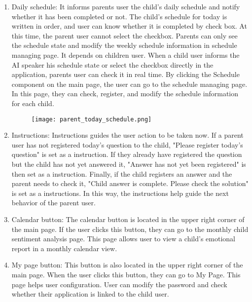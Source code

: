 \documentclass[conference]{IEEEtran}
\begin{document}
\begin{enumerate}
\begin{enumerate}
                \item Daily schedule:
                It informs parents user the child's daily schedule and notify whether it has been completed or not. The child's schedule for today is written in order, and user can know whether it is completed by check box. At this time, the parent user cannot select the checkbox. Parents can only see the schedule state and modify the weekly schedule information in schedule managing page. It depends on children user. When a child user informs the AI speaker his schedule state or select the checkbox directly in the application, parents user can check it in real time. \hfill \break
                By clicking the Schedule component on the main page, the user can go to the schedule managing page. In this page, they can check, register, and modify the schedule information for each child.
                \begin{figure}[H]
                 \centering
                 \texttt{[image: parent\_today\_schedule.png]}
                 \end{figure}
                \item Instructions:
                Instructions guides the user action to be taken now. If a parent user has not registered today's question to the child, "Please register today's question" is set as a instruction. If they already have registered the question but the child has not yet answered it, "Answer has not yet been registered" is then set as a instruction. Finally, if the child registers an answer and the parent needs to check it, "Child answer is complete. Please check the solution" is set as a instructions. In this way, the instructions help guide the next behavior of the parent user.
                \item Calendar button:
                The calendar button is located in the upper right corner of the main page. If the user clicks this button, they can go to the monthly child sentiment analysis page. This page allows user to view a child's emotional report in a monthly calendar view.
                \item My page button:
                This button is also located in the upper right corner of the main page. When the user clicks this button, they can go to My Page. This page helps user configuration. User can modify the password and check whether their application is linked to the child user.
            \end{enumerate}
            
            
            

\end{enumerate}
\end{document}
